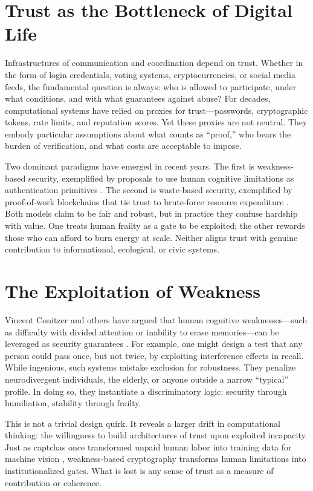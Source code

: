 \documentclass{book}
\begin{document}
\section{Trust as the Bottleneck of Digital Life}

Infrastructures of communication and coordination depend on trust. Whether in the form of login credentials, voting systems, cryptocurrencies, or social media feeds, the fundamental question is always: who is allowed to participate, under what conditions, and with what guarantees against abuse? For decades, computational systems have relied on proxies for trust—passwords, cryptographic tokens, rate limits, and reputation scores. Yet these proxies are not neutral. They embody particular assumptions about what counts as ``proof,'' who bears the burden of verification, and what costs are acceptable to impose.

Two dominant paradigms have emerged in recent years. The first is weakness-based security, exemplified by proposals to use human cognitive limitations as authentication primitives \cite{conitzer2020}. The second is waste-based security, exemplified by proof-of-work blockchains that tie trust to brute-force resource expenditure \cite{nakamoto2008}. Both models claim to be fair and robust, but in practice they confuse hardship with value. One treats human frailty as a gate to be exploited; the other rewards those who can afford to burn energy at scale. Neither aligns trust with genuine contribution to informational, ecological, or civic systems.

\section{The Exploitation of Weakness}

Vincent Conitzer and others have argued that human cognitive weaknesses—such as difficulty with divided attention or inability to erase memories—can be leveraged as security guarantees \cite{conitzer2020}. For example, one might design a test that any person could pass once, but not twice, by exploiting interference effects in recall. While ingenious, such systems mistake exclusion for robustness. They penalize neurodivergent individuals, the elderly, or anyone outside a narrow ``typical'' profile. In doing so, they instantiate a discriminatory logic: security through humiliation, stability through frailty.

This is not a trivial design quirk. It reveals a larger drift in computational thinking: the willingness to build architectures of trust upon exploited incapacity. Just as captchas once transformed unpaid human labor into training data for machine vision \cite{vonahn2003}, weakness-based cryptography transforms human limitations into institutionalized gates. What is lost is any sense of trust as a measure of contribution or coherence.
\end{document}
